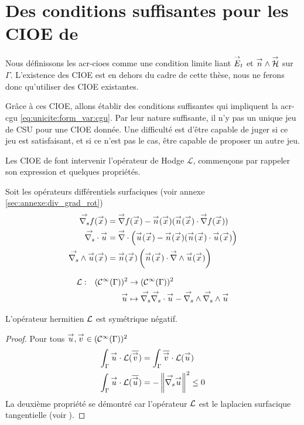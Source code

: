 \section[Des CSU pour les CIOE de Stupfel et Poget 2011]{Des conditions suffisantes pour les CIOE de \cite{stupfel_sufficient_2011}}

  Nous définissons les \glspl{acr-cioe} comme une condition limite liant \(\vE_t\) et \(\vn\pvect\vH\) sur \(\Gamma\). L'existence des CIOE est en dehors du cadre de cette thèse, nous ne ferons donc qu'utiliser des CIOE existantes.

  Grâce à ces CIOE, allons établir des conditions suffisantes qui impliquent la \gls{acr-cgu} \eqref{eq:unicite:form_var:cgu}. Par leur nature suffisante, il n'y pas un unique jeu de CSU pour une CIOE donnée. Une difficulté est d'être capable de juger si ce jeu est satisfaisant, et si ce n'est pas le cas, être capable de proposer un autre jeu.

  Les CIOE de \cite{stupfel_sufficient_2011} font intervenir l'opérateur de Hodge \(\mathcal{L}\), commençons par rappeler son expression et quelques propriétés.

  Soit les opérateurs différentiels surfaciques (voir annexe \ref{sec:annexe:div_grad_rot})
  \begin{align*}
        \vgrads{f}(\vx) &= \vgrad{f}(\vx) - \vn(\vx) (\vn(\vx) \cdot \vgrad{f}(\vx))
        \\
        \vdivs{\vu} &= \vdiv\left(\vu(\vx) - \vn(\vx) (\vn(\vx) \cdot \vu(\vx)\right)
        \\
        \vrots{\vu}(\vx) &= \vn(\vx)\left(\vn(\vx) \cdot \vrot{\vu}(\vx)\right)
    \end{align*}

  \begin{defn}
    \label{def:operator:L}
    \begin{equation*}
        \fonction{\LL}{(\mathcal{C}^\infty(\Gamma))^2}{(\mathcal{C}^\infty(\Gamma))^2}%
          {\vu}{\vgrads{\vdivs \vu} - \vrots{\vrots \vu}}
    \end{equation*}
  \end{defn}

  \begin{prop}
    \label{eq:hodge:negatif}
    L’opérateur hermitien \(\LL\) est symétrique négatif.
  \end{prop}

  \begin{proof}
    Pour tous \(\vu,\vv \in (\mathcal C^\infty(\Gamma))^2\)
    \begin{align*}
      \int_\Gamma \vu\cdot \LL(\conj{\vv}) &= \int_\Gamma \conj{\vv}\cdot \LL(\vu)
      \\
      \int_\Gamma \vu\cdot \LL(\conj{\vu}) &= -\norm{\vgrads{\vu}}^2 \le 0
    \end{align*}
    La deuxième propriété se démontré car l'opérateur \(\LL\) est le laplacien surfacique tangentielle (voir \cite[p.~1028]{bladel_electromagnetic_2007}).
  \end{proof}

